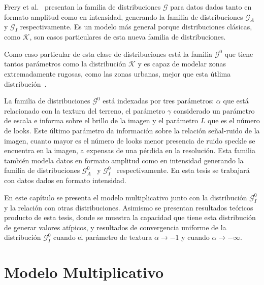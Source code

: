 Frery et al.~\cite{Frery97,Frery99} presentan la familia de distribuciones $\mathcal{G}$ para datos dados tanto en formato amplitud como en intensidad, generando la familia de distribuciones $\mathcal{G}_A$ y $\mathcal{G}_I$ respectivamente. Es un modelo más general porque distribuciones clásicas, como $\mathcal{K}$, son casos particulares de esta nueva familia de distribuciones.

Como caso particular de esta clase de distribuciones está la familia $\mathcal{G}^0$ que tiene tantos parámetros como la distribución $\mathcal{K}$ y es capaz de modelar zonas extremadamente rugosas, como las zonas urbanas, mejor que esta útlima distribución~\cite{Mejail99}. 

La familia de distribuciones $\mathcal{G}^0$ está indexadas por tres parámetros: $\alpha$ que está relacionado con la textura del terreno, el parámetro $\gamma$ considerado un parámetro de escala e informa sobre el brillo de la imagen y el parámetro $L$ que es el número de looks. Este último parámetro da información sobre la relación señal-ruido de la imagen, cuanto mayor es el número de looks menor presencia de ruido speckle se encuentra en la imagen, a expensas de una pérdida en la resolución. Esta familia también modela datos en formato amplitud como en intensidad generando la familia de distribuciones $\mathcal{G}_A^0$~\cite{Frery97} y $\mathcal{G}_I^0$~\cite{Frery97,Frery99} respectivamente. En esta tesis se trabajará con datos dados en formato intensidad.

En este capítulo se presenta el modelo multiplicativo junto con la distribución $\mathcal{G}_I^0$ y la relación con otras distribuciones. Asimismo se presentan resultados teóricos producto de esta tesis, donde se muestra la capacidad que tiene esta distribución de generar valores atípicos, y resultados de convergencia uniforme de la distribución $\mathcal{G}_I^0$ cuando el parámetro de textura $\alpha \longrightarrow -1$ y cuando $\alpha \longrightarrow -\infty$.


\section{Modelo Multiplicativo}
\label{ModeloMultiplicativo}

